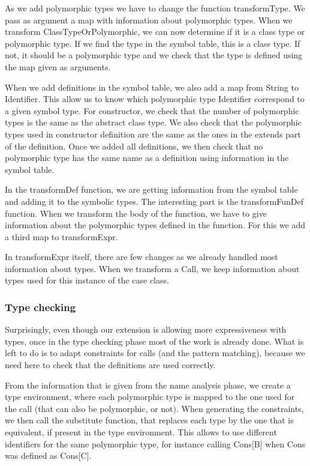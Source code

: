 As we add polymorphic types we have to change the function transformType. We pass as argument a map with information about polymorphic types. When we transform ClassTypeOrPolymorphic, we can now determine if it is a class type or polymorphic type. If we find the type in the symbol table, this is a class type. If not, it should be a polymorphic type and we check that the type is defined using the map given as arguments.

When we add definitions in the symbol table, we also add a map from String to Identifier. This allow us to know which polymorphic type Identifier correspond to a given symbol type. For constructor, we check that the number of polymorphic types is the same as the abstract class type. We also check that the polymorphic types used in constructor definition are the same as the ones in the extends part of the definition. Once we added all definitions, we then check that no polymorphic type has the same name as a definition using information in the symbol table.

In the transformDef function, we are getting information from the symbol table and adding it to the symbolic types. The interesting part is the transformFunDef function. When we transform the body of the function, we have to give information about the polymorphic types defined in the function. For this we add a third map to transformExpr.

In transformExpr itself, there are few changes as we already handled most information about types. When we transform a Call, we keep information about types used for this instance of the case class.
\subsubsection{Type checking}
Surprisingly, even though our extension is allowing more expressiveness with types, once in the type checking phase most of the work is already done. What is left to do is to adapt constraints for calls (and the pattern matching), because we need here to check that the definitions are used correctly. 

From the information that is given from the name analysis phase, we create a type environment, where each polymorphic type is mapped to the one used for the call (that can also be polymorphic, or not). When generating the constraints, we then call the substitute function, that replaces each type by the one that is equivalent, if present in the type environment. This allows to use different identifiers for the same polymorphic type, for instance calling Cons[B] when Cons was defined as Cons[C].

